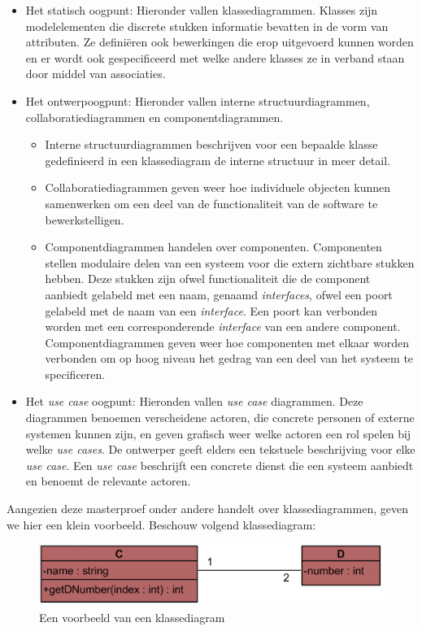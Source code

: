 \begin{itemize}
	\item Het statisch oogpunt: Hieronder vallen klassediagrammen. Klasses zijn modelelementen die discrete stukken informatie bevatten in de vorm van attributen. Ze defini\"eren ook bewerkingen die erop uitgevoerd kunnen worden en er wordt ook gespecificeerd met welke andere klasses ze in verband staan door middel van associaties.
	\item Het ontwerpoogpunt: Hieronder vallen interne structuurdiagrammen, collaboratiediagrammen en componentdiagrammen.
	\begin{itemize}
		\item Interne structuurdiagrammen beschrijven voor een bepaalde klasse gedefinieerd in een klassediagram de interne structuur in meer detail.
		\item Collaboratiediagrammen geven weer hoe individuele objecten kunnen samenwerken om een deel van de functionaliteit van de software te bewerkstelligen.
		\item Componentdiagrammen handelen over componenten. Componenten stellen modulaire delen van een systeem voor die extern zichtbare stukken hebben. Deze stukken zijn ofwel functionaliteit die de component aanbiedt gelabeld met een naam, genaamd \textit{interfaces}, ofwel een poort gelabeld met de naam van een \textit{interface}. Een poort kan verbonden worden met een corresponderende \textit{interface} van een andere component. Componentdiagrammen geven weer hoe componenten met elkaar worden verbonden om op hoog niveau het gedrag van een deel van het systeem te specificeren.
	\end{itemize}
	\item Het \textit{use case} oogpunt: Hieronden vallen \textit{use case} diagrammen. Deze diagrammen benoemen verscheidene actoren, die concrete personen of externe systemen kunnen zijn, en geven grafisch weer welke actoren een rol spelen bij welke \textit{use cases}. De ontwerper geeft elders een tekstuele beschrijving voor elke \textit{use case}. Een \textit{use case} beschrijft een concrete dienst die een systeem aanbiedt en benoemt de relevante actoren.
\end{itemize}

Aangezien deze masterproef onder andere handelt over klassediagrammen, geven we hier een klein voorbeeld. Beschouw volgend klassediagram:

\begin{figure}[H]
	\label{fig:cd}
	\centering
	\includegraphics{intro/cd.png}
	\caption{Een voorbeeld van een klassediagram}
\end{figure}


